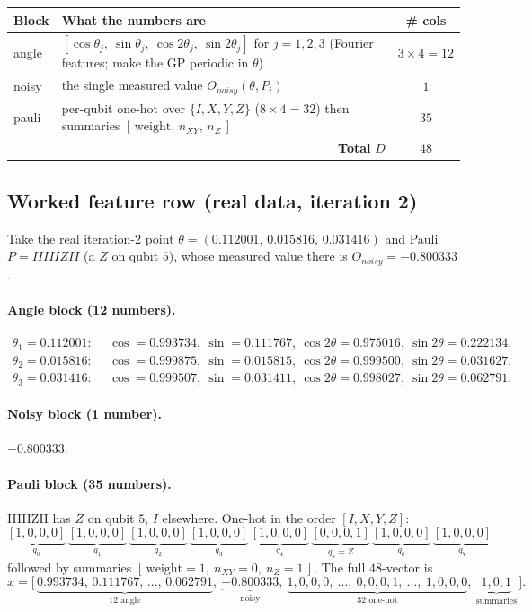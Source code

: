 \documentclass[11pt]{article}
\def\bm#1{#1}%
\def\texttt#1{#1}%
\def\mathrm#1{#1}%
\begin{document}
\begin{center}
\renewcommand{\arraystretch}{1.25}
\begin{tabular}{@{}p{2.0cm} p{8.2cm} c@{}}
\toprule
\textbf{Block} & \textbf{What the numbers are} & \textbf{\# cols} \\
\midrule
angle &
$[\cos\theta_j,\ \sin\theta_j,\ \cos 2\theta_j,\ \sin 2\theta_j]$ for $j=1,2,3$
(Fourier features; make the GP periodic in $\theta$) & $3\!\times\!4=12$ \\
noisy & the single measured value $O_{\mathrm{noisy}}(\bm\theta,P_i)$ & $1$ \\
pauli & per-qubit one-hot over $\{I,X,Y,Z\}$ ($8\!\times\!4=32$) then summaries
$[\,\text{weight},\,n_{XY},\,n_Z\,]$ & $35$ \\
\midrule
\multicolumn{2}{r}{\textbf{Total } $D$} & $\bm{48}$ \\
\bottomrule
\end{tabular}
\end{center}

\subsection*{Worked feature row (real data, iteration 2)}
Take the real iteration-2 point $\bm\theta=(0.112001,\,0.015816,\,0.031416)$ and
Pauli $P=\texttt{IIIIIZII}$ (a $Z$ on qubit $5$), whose measured value there is
$O_{\mathrm{noisy}}=-0.800333$.

\paragraph{Angle block (12 numbers).}
\[
\begin{aligned}
\theta_1=0.112001:&\ \ \cos=0.993734,\ \sin=0.111767,\ \cos2\theta=0.975016,\ \sin2\theta=0.222134,\\
\theta_2=0.015816:&\ \ \cos=0.999875,\ \sin=0.015815,\ \cos2\theta=0.999500,\ \sin2\theta=0.031627,\\
\theta_3=0.031416:&\ \ \cos=0.999507,\ \sin=0.031411,\ \cos2\theta=0.998027,\ \sin2\theta=0.062791.
\end{aligned}
\]
\paragraph{Noisy block (1 number).} $-0.800333$.
\paragraph{Pauli block (35 numbers).} \texttt{IIIIIZII} has $Z$ on qubit $5$, $I$
elsewhere. One-hot in the order $[I,X,Y,Z]$:
\[
\underbrace{[1,0,0,0]}_{q_0}\,
\underbrace{[1,0,0,0]}_{q_1}\,
\underbrace{[1,0,0,0]}_{q_2}\,
\underbrace{[1,0,0,0]}_{q_3}\,
\underbrace{[1,0,0,0]}_{q_4}\,
\underbrace{[0,0,0,1]}_{q_5=Z}\,
\underbrace{[1,0,0,0]}_{q_6}\,
\underbrace{[1,0,0,0]}_{q_7}
\]
followed by summaries $[\,\text{weight}=1,\ n_{XY}=0,\ n_Z=1\,]$. The full $48$-vector is
\[
\bm x=\big[\,
\underbrace{0.993734,\,0.111767,\,\ldots,\,0.062791}_{12\text{ angle}},\ 
\underbrace{-0.800333}_{\text{noisy}},\ 
\underbrace{1,0,0,0,\ \ldots,\ 0,0,0,1,\ \ldots,\ 1,0,0,0}_{32\text{ one-hot}},\ 
\underbrace{1,0,1}_{\text{summaries}}
\,\big].
\]
\end{document}
